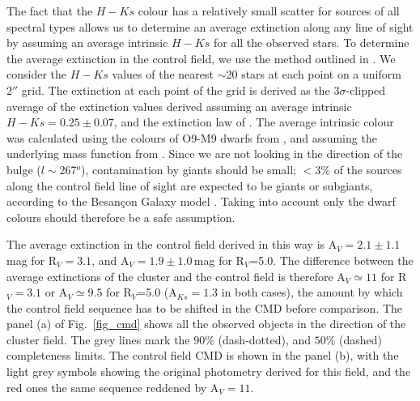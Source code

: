 \documentclass[a4paper,fleqn,usenatbib]{mnras}
\begin{document}
The fact that the $H-Ks$ colour has a relatively small scatter for sources of all spectral types
allows us to determine an average extinction along any line of sight by assuming an average
intrinsic $H-Ks$ for all the observed stars.
To determine the average extinction
in the control field, we use the method outlined in \citet{gutermuth05}. We consider the $H-Ks$ values
of the nearest $\sim$20 stars at each point on a uniform $2''$ grid. The extinction at each point of the grid
is derived as the 3$\sigma$-clipped average of the extinction values derived assuming an average intrinsic
 $H-Ks=0.25\pm 0.07$, and the extinction law of \citet{cardelli89}. The average intrinsic colour was calculated 
 using the colours of O9-M9 dwarfs from \citet{pecaut13}, and assuming the underlying mass function from \citet{chabrier05}.
Since we are not looking in the direction of the bulge ($l\sim$267$^o$), contamination by giants should be small;
$<3\%$ of the sources along the control field line of sight
are expected to be giants or subgiants, according to the Besan\c{c}on Galaxy model \citep{robin03}. 
Taking into account only the dwarf colours should therefore be a safe assumption. 
 
The average extinction in the control field derived in this way is A$_V = 2.1 \pm 1.1\,$mag for R$_V=3.1$, and A$_V = 1.9 \pm 1.0\,$mag for R$_V$=5.0. %
The difference between
the average extinctions of the cluster and the control field is therefore A$_V \simeq 11$ for R$_V=3.1$ or A$_V \simeq 9.5$ for R$_V$=5.0 (A$_{Ks}=1.3$ in both cases), the amount
by which the control field sequence has to be shifted in the CMD before comparison. 
The panel (a) of Fig.~\ref{fig_cmd} shows all the observed objects in the direction of the cluster field. The grey lines mark the $90\%$ (dash-dotted), 
and $50\%$ (dashed) completeness limits. The control field CMD is shown in the panel (b), with the light grey symbols
showing the original photometry derived for this field, and the red ones the same sequence reddened by A$_V = 11$. 
\end{document}
